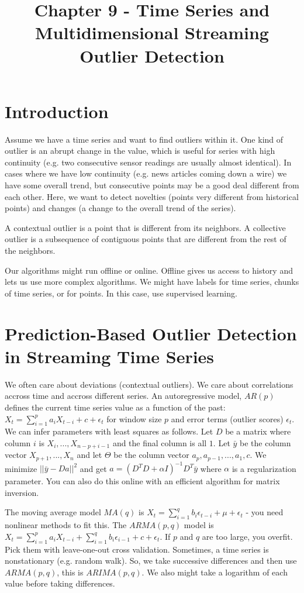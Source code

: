 \documentclass[a4paper]{article}
\title{Chapter 9 - Time Series and Multidimensional Streaming Outlier Detection}
\date{}
\begin{document}
\maketitle

\section{Introduction}
Assume we have a time series and want to find outliers within it. One kind
of outlier is an abrupt change in the value, which is useful for series with
high continuity (e.g. two consecutive sensor readings are usually almost
identical). In cases where we have low continuity (e.g. news articles coming
down a wire) we have some overall trend, but consecutive points may be a good
deal different from each other. Here, we want to detect novelties (points
very different from historical points) and changes (a change to the
overall trend of the series).

A contextual outlier is a point that is different from its neighbors. A
collective outlier is a subsequence of contiguous points that are different
from the rest of the neighbors.

Our algorithms might run offline or online. Offline gives us access to history
and lets us use more complex algorithms. We might have labels for time series,
chunks of time series, or for points. In this case, use supervised learning.

\section{Prediction-Based Outlier Detection in Streaming Time Series}
We often care about deviations (contextual outliers). We care about correlations
accross time and accross different series. An autoregressive model, $AR(p)$
defines the current time series value as a function of the past:
$X_t = \sum_{i=1}^{p}{a_i X_{t-i}} + c + \epsilon_t$ for window size $p$
and error terms (outlier scores) $\epsilon_t$. We can infer parameters
with least squares as follows. Let $D$ be a matrix where column $i$ is
$X_i, ..., X_{n-p+i-1}$ and the final column is all $1$. Let $\bar{y}$ be
the column vector $X_{p+1}, ..., X_n$ and let $\Theta$ be the column vector
$a_p, a_{p-1}, ..., a_1, c$. We minimize $||\bar{y} - Da||^2$ and get
$a = (D^T D + \alpha I)^{-1} D^T \bar{y}$ where $\alpha$ is a regularization
parameter. You can also do this online with an efficient algorithm for matrix
inversion.

The moving average model $MA(q)$ is $X_t = \sum_{i=1}^{q}{b_i \epsilon_{t-i} +
\mu + \epsilon_t}$ - you need nonlinear methods to fit this. The
$ARMA(p, q)$ model is $X_t = \sum_{i=1}^{p}{a_i X_{t-i}} + \sum_{i=1}^{q}{
b_i \epsilon_{i-1}} + c + \epsilon_t$. If $p$ and $q$ are too large, you
overfit. Pick them with leave-one-out cross validation. Sometimes, a time
series is nonstationary (e.g. random walk). So, we take successive differences
and then use $ARMA(p, q)$, this is $ARIMA(p, q)$. We also might take a logarithm
of each value before taking differences.
\end{document}
